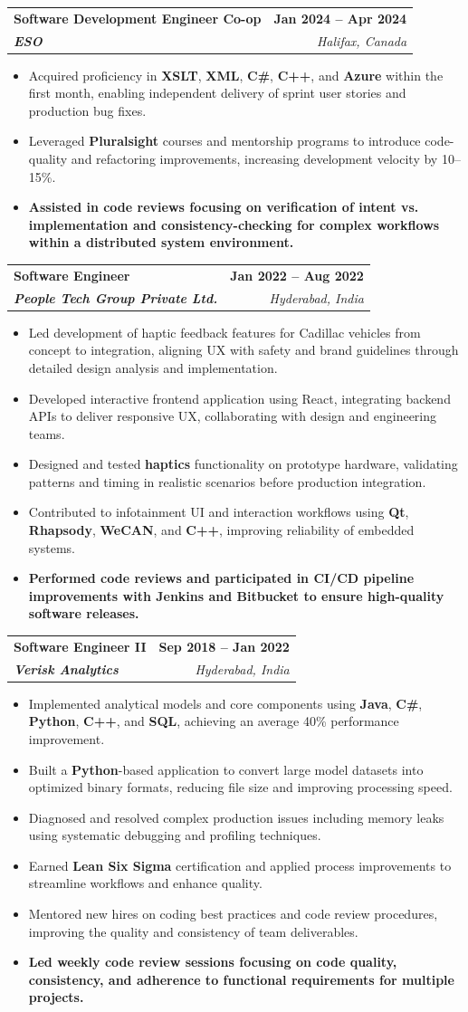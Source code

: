 \documentclass[letterpaper,11pt]{article}
\makeatletter
\newcommand{\resumeItem}[1]{
  \item\small{
    {#1 \vspace{-2pt}}
  }
}
\newcommand{\resumeSubheading}[4]{
  \vspace{-2pt}\item
    \begin{tabular*}{1.0\textwidth}[t]{l@{\extracolsep{\fill}}r}
      \textbf{#1} & \textbf{\small #2} \\
      \textit{\small#3} & \textit{\small #4} \\
    \end{tabular*}\vspace{-7pt}
}
\newcommand{\resumeItemListStart}{\begin{itemize}}
\newcommand{\resumeItemListEnd}{\end{itemize}\vspace{-5pt}}
\makeatother
\begin{document}
    \resumeSubheading
      {\textbf{Software Development Engineer Co-op}}{\textbf{Jan 2024 -- Apr 2024}}
      {\textbf{ESO}}{Halifax, Canada}
      \resumeItemListStart
        \resumeItem{Acquired proficiency in \textbf{XSLT}, \textbf{XML}, \textbf{C\#}, \textbf{C++}, and \textbf{Azure} within the first month, enabling independent delivery of sprint user stories and production bug fixes.}
        \resumeItem{Leveraged \textbf{Pluralsight} courses and mentorship programs to introduce code-quality and refactoring improvements, increasing development velocity by 10–15\%.}
        \resumeItem{\textbf{Assisted in code reviews focusing on verification of intent vs. implementation and consistency-checking for complex workflows within a distributed system environment.}}
      \resumeItemListEnd

    \resumeSubheading
      {\textbf{Software Engineer}}{\textbf{Jan 2022 -- Aug 2022}}
      {\textbf{People Tech Group Private Ltd.}}{Hyderabad, India}
      \resumeItemListStart
        \resumeItem{Led development of haptic feedback features for Cadillac vehicles from concept to integration, aligning UX with safety and brand guidelines through detailed design analysis and implementation.}
        \resumeItem{Developed interactive frontend application using React, integrating backend APIs to deliver responsive UX, collaborating with design and engineering teams.}
        \resumeItem{Designed and tested \textbf{haptics} functionality on prototype hardware, validating patterns and timing in realistic scenarios before production integration.}
        \resumeItem{Contributed to infotainment UI and interaction workflows using \textbf{Qt}, \textbf{Rhapsody}, \textbf{WeCAN}, and \textbf{C++}, improving reliability of embedded systems.}
        \resumeItem{\textbf{Performed code reviews and participated in CI/CD pipeline improvements with Jenkins and Bitbucket to ensure high-quality software releases.}}
      \resumeItemListEnd

    \resumeSubheading
      {\textbf{Software Engineer II}}{\textbf{Sep 2018 -- Jan 2022}}
      {\textbf{Verisk Analytics}}{Hyderabad, India}
      \resumeItemListStart
        \resumeItem{Implemented analytical models and core components using \textbf{Java}, \textbf{C\#}, \textbf{Python}, \textbf{C++}, and \textbf{SQL}, achieving an average 40\% performance improvement.}
        \resumeItem{Built a \textbf{Python}-based application to convert large model datasets into optimized binary formats, reducing file size and improving processing speed.}
        \resumeItem{Diagnosed and resolved complex production issues including memory leaks using systematic debugging and profiling techniques.}
        \resumeItem{Earned \textbf{Lean Six Sigma} certification and applied process improvements to streamline workflows and enhance quality.}
        \resumeItem{Mentored new hires on coding best practices and code review procedures, improving the quality and consistency of team deliverables.}
        \resumeItem{\textbf{Led weekly code review sessions focusing on code quality, consistency, and adherence to functional requirements for multiple projects.}}
      \resumeItemListEnd
\end{document}
